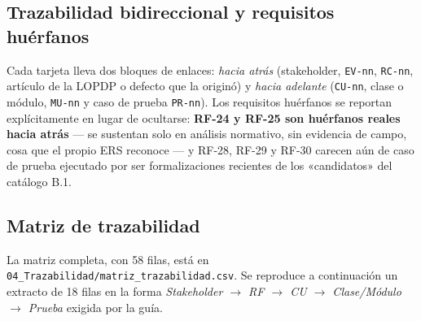 \documentclass[11pt,letterpaper]{article}
\begin{document}
\subsection{Trazabilidad bidireccional y requisitos huérfanos}
Cada tarjeta lleva dos bloques de enlaces: \emph{hacia atrás} (stakeholder, \texttt{EV-nn}, \texttt{RC-nn}, artículo de la LOPDP o defecto que la originó) y \emph{hacia adelante} (\texttt{CU-nn}, clase o módulo, \texttt{MU-nn} y caso de prueba \texttt{PR-nn}). Los requisitos huérfanos se reportan explícitamente en lugar de ocultarse: \textbf{RF-24 y RF-25 son huérfanos reales hacia atrás} --- se sustentan solo en análisis normativo, sin evidencia de campo, cosa que el propio ERS reconoce --- y RF-28, RF-29 y RF-30 carecen aún de caso de prueba ejecutado por ser formalizaciones recientes de los «candidatos» del catálogo B.1.

\subsection{Matriz de trazabilidad}
La matriz completa, con 58 filas, está en \texttt{04\_Trazabilidad/matriz\_trazabilidad.csv}. Se reproduce a continuación un extracto de 18 filas en la forma \emph{Stakeholder $\rightarrow$ RF $\rightarrow$ CU $\rightarrow$ Clase/Módulo $\rightarrow$ Prueba} exigida por la guía.
\end{document}
